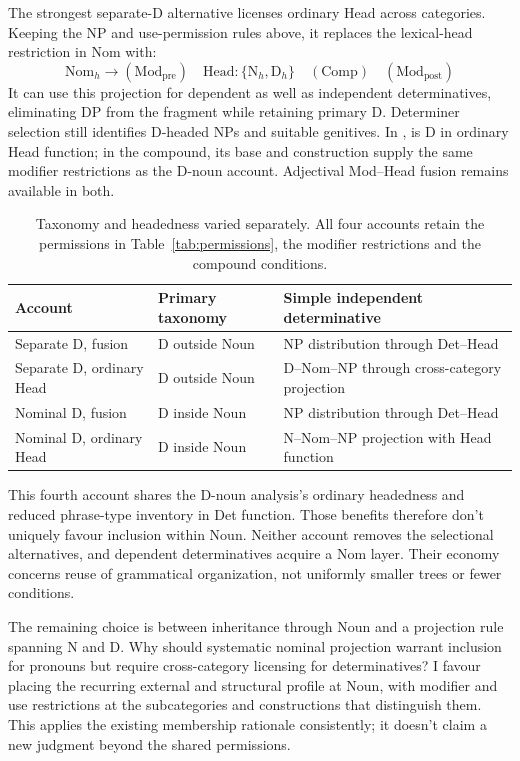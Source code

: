 \documentclass[12pt]{article}
\begin{document}
The strongest separate-D alternative licenses ordinary Head across categories. Keeping the NP and use-permission rules above, it replaces the lexical-head restriction in Nom with:
\[
\mathrm{Nom}_{h}\to(\mathrm{Mod}_{\mathrm{pre}})\quad\mathrm{Head}:\{\mathrm{N}_{h},\mathrm{D}_{h}\}\quad(\mathrm{Comp})\quad(\mathrm{Mod}_{\mathrm{post}})
\]
It can use this projection for dependent as well as independent determinatives, eliminating DP from the fragment while retaining primary D. Determiner selection still identifies D-headed NPs and suitable genitives. In ,  is D in ordinary Head function; in the compound, its base and construction supply the same modifier restrictions as the D-noun account. Adjectival Mod--Head fusion remains available in both.

\begin{table}[tb]
\centering\small
\caption{Taxonomy and headedness varied separately. All four accounts retain the permissions in Table~\ref{tab:permissions}, the modifier restrictions and the compound conditions.}\label{tab:economy}
\begin{tabular}{>{\raggedright\arraybackslash}p{3.1cm}>{\raggedright\arraybackslash}p{3.9cm}>{\raggedright\arraybackslash}p{4.7cm}}
\toprule
Account & Primary taxonomy & Simple independent determinative \\
\midrule
Separate D, fusion & D outside Noun & NP distribution through Det--Head \\
Separate D, ordinary Head & D outside Noun & D--Nom--NP through cross-category projection \\
Nominal D, fusion & D inside Noun & NP distribution through Det--Head \\
Nominal D, ordinary Head & D inside Noun & N--Nom--NP projection with Head function \\
\bottomrule
\end{tabular}
\end{table}

This fourth account shares the D-noun analysis's ordinary headedness and reduced phrase-type inventory in Det function. Those benefits therefore don't uniquely favour inclusion within Noun. Neither account removes the selectional alternatives, and dependent determinatives acquire a Nom layer. Their economy concerns reuse of grammatical organization, not uniformly smaller trees or fewer conditions.

The remaining choice is between inheritance through Noun and a projection rule spanning N and D. Why should systematic nominal projection warrant inclusion for pronouns but require cross-category licensing for determinatives? I favour placing the recurring external and structural profile at Noun, with modifier and use restrictions at the subcategories and constructions that distinguish them. This applies the existing membership rationale consistently; it doesn't claim a new judgment beyond the shared permissions.
\end{document}
